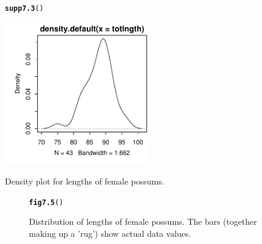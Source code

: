 \documentclass[12pt, a4paper,  BCOR=8.25mm, DIV=15]{scrartcl}\usepackage[]{graphicx}\usepackage[]{color}
\makeatletter
\newcommand{\hlstd}[1]{\textcolor[rgb]{0.345,0.345,0.345}{#1}}%
\newcommand{\hlkwd}[1]{\textcolor[rgb]{0.737,0.353,0.396}{\textbf{#1}}}%
\newenvironment{kframe}{%
 \def\at@end@of@kframe{}%
 \ifinner\ifhmode%
  \def\at@end@of@kframe{\end{minipage}}%
  \begin{minipage}{\columnwidth}%
 \fi\fi%
 \def\FrameCommand##1{\hskip\@totalleftmargin \hskip-\fboxsep
 \colorbox{shadecolor}{##1}\hskip-\fboxsep
     \hskip-\linewidth \hskip-\@totalleftmargin \hskip\columnwidth}%
 \MakeFramed {\advance\hsize-\width
   \@totalleftmargin\z@ \linewidth\hsize
   \@setminipage}}%
 {\par\unskip\endMakeFramed%
 \at@end@of@kframe}
\newenvironment{knitrout}{}{} %
\makeatother
\begin{document}
\begin{suppfigure}
\begin{knitrout}
\color{fgcolor}\begin{kframe}
\begin{alltt}
\hlkwd{supp7.3}\hlstd{()}
\end{alltt}
\end{kframe}

{\centering \includegraphics[width=0.47\textwidth]{figure/gph-supp7_3e-1} 

}



\end{knitrout}
\caption{Density plot for lengths of female possums.}
\end{suppfigure}

\clearpage


\begin{figure}[ht]
\begin{knitrout}
\color{fgcolor}\begin{kframe}
\begin{alltt}
\hlkwd{fig7.5}\hlstd{()}
\end{alltt}
\end{kframe}
\end{knitrout}
\vspace*{-18pt}

\caption{Distribution of lengths of female possums.
The bars (together making up a 'rug') show actual data values.\label{fig:boxrugs}}
\end{figure}
\end{document}
